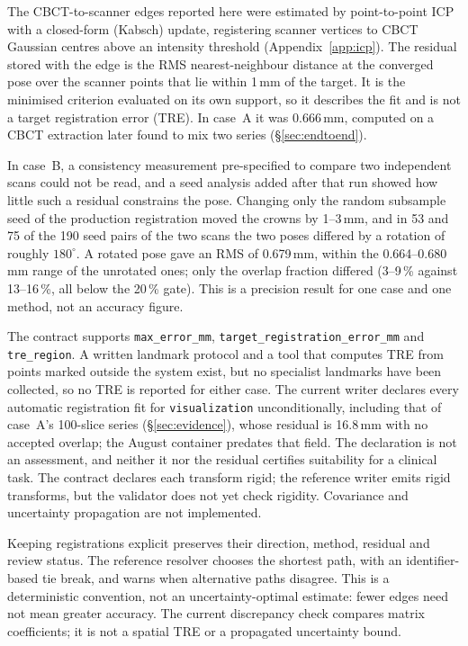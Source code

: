 \documentclass[11pt,a4paper]{article}
\newcommand{\code}[1]{\texttt{\small #1}}
\newenvironment{finding}[1]
 {\par\medskip\noindent{\color{uosblue}\rule{\linewidth}{0.9pt}}\par\nobreak\vspace{3pt}
  \noindent{\bfseries\color{uosblue}#1}\par\nobreak\vspace{2pt}}
 {\par\vspace{2pt}\noindent{\color{uosrule}\rule{\linewidth}{0.6pt}}\par\medskip}
\begin{document}
The CBCT-to-scanner edges reported here were estimated by point-to-point ICP with a
closed-form (Kabsch) update, registering scanner vertices to CBCT Gaussian centres above an
intensity threshold (Appendix~\ref{app:icp}). The residual stored with the edge is the RMS
nearest-neighbour distance at the converged pose over the scanner points that lie within
1\,mm of the target. It is the minimised criterion evaluated on its own support, so it
describes the fit and is not a target registration error (TRE). In case~A it was 0.666\,mm,
computed on a CBCT extraction later found to mix two series (\S\ref{sec:endtoend}).

In case~B, a consistency measurement pre-specified to compare two independent scans could
not be read, and a seed analysis added after that run showed how little such a residual
constrains the pose. Changing only the random subsample seed of the production registration
moved the crowns by 1--3\,mm, and in 53 and 75 of the 190 seed pairs of the two scans the two
poses differed by a rotation of roughly $180^\circ$. A rotated pose gave an RMS of 0.679\,mm, within the 0.664--0.680\,mm
range of the unrotated ones; only the overlap fraction differed (3--9\,\% against
13--16\,\%, all below the 20\,\% gate). This is a precision result for one case and one
method, not an accuracy figure.

The contract supports \code{max\_error\_mm}, \code{target\_registration\_error\_mm} and
\code{tre\_region}. A written landmark protocol and a tool that computes TRE from points
marked outside the system exist, but no specialist landmarks have been collected, so no TRE
is reported for either case. The current writer declares every automatic registration fit
for \code{visualization} unconditionally, including that of case~A's 100-slice series
(\S\ref{sec:evidence}), whose residual is 16.8\,mm with no accepted overlap; the August
container predates that field. The declaration is not an assessment, and neither it nor the
residual certifies suitability for a clinical task. The contract declares each transform rigid; the reference
writer emits rigid transforms, but the validator does not yet check rigidity. Covariance and
uncertainty propagation are not implemented.

\begin{finding}{Why retain the registration graph}
Keeping registrations explicit preserves their direction, method, residual and review
status. The reference resolver chooses the shortest path, with an identifier-based tie
break, and warns when alternative paths disagree. This is a deterministic convention,
not an uncertainty-optimal estimate: fewer edges need not mean greater accuracy.
The current discrepancy check compares matrix coefficients; it is not a spatial TRE or
a propagated uncertainty bound.
\end{finding}
\end{document}

